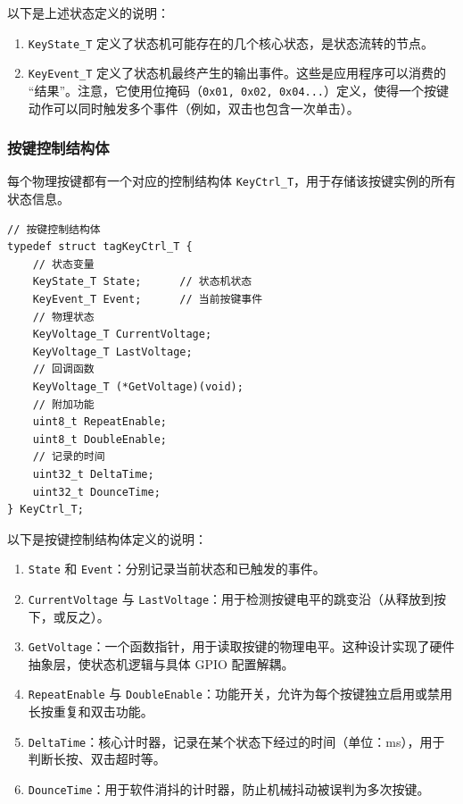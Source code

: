 以下是上述状态定义的说明：

\begin{enumerate}
\item \texttt{KeyState\_T} 定义了状态机可能存在的几个核心状态，是状态流转的节点。
\item \texttt{KeyEvent\_T} 定义了状态机最终产生的输出事件。这些是应用程序可以消费的 “结果”。注意，它使用位掩码（\texttt{0x01, 0x02, 0x04...}）定义，使得一个按键动作可以同时触发多个事件（例如，双击也包含一次单击）。
\end{enumerate}

\subsubsection{按键控制结构体}

每个物理按键都有一个对应的控制结构体 \texttt{KeyCtrl\_T}，用于存储该按键实例的所有状态信息。

\begin{lstlisting}[style=c]
// 按键控制结构体
typedef struct tagKeyCtrl_T {
    // 状态变量
    KeyState_T State;      // 状态机状态
    KeyEvent_T Event;      // 当前按键事件
    // 物理状态
    KeyVoltage_T CurrentVoltage;
    KeyVoltage_T LastVoltage;
    // 回调函数
    KeyVoltage_T (*GetVoltage)(void);
    // 附加功能
    uint8_t RepeatEnable;
    uint8_t DoubleEnable;
    // 记录的时间
    uint32_t DeltaTime;
    uint32_t DounceTime;
} KeyCtrl_T;
\end{lstlisting}

以下是按键控制结构体定义的说明：

\begin{enumerate}
\item \texttt{State} 和 \texttt{Event}：分别记录当前状态和已触发的事件。
\item \texttt{CurrentVoltage} 与 \texttt{LastVoltage}：用于检测按键电平的跳变沿（从释放到按下，或反之）。
\item \texttt{GetVoltage}：一个函数指针，用于读取按键的物理电平。这种设计实现了硬件抽象层，使状态机逻辑与具体 GPIO 配置解耦。
\item \texttt{RepeatEnable} 与 \texttt{DoubleEnable}：功能开关，允许为每个按键独立启用或禁用长按重复和双击功能。
\item \texttt{DeltaTime}：核心计时器，记录在某个状态下经过的时间（单位：ms），用于判断长按、双击超时等。
\item \texttt{DounceTime}：用于软件消抖的计时器，防止机械抖动被误判为多次按键。
\end{enumerate}

